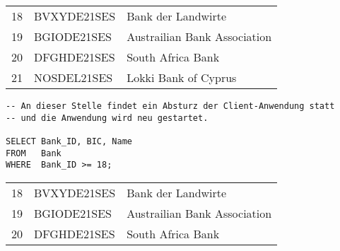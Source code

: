 \begin{center}
    \begin{small}
        \tablehead{}
        \begin{msoraclesql}
            \begin{supertabular}{rll}
                18 & BVXYDE21SES & Bank der Landwirte \\
                19 & BGIODE21SES & Austrailian Bank Association \\
                20 & DFGHDE21SES & South Africa Bank \\
                21 & NOSDEL21SES & Lokki Bank of Cyprus  \\
            \end{supertabular}
        \end{msoraclesql}
    \end{small}
\end{center}
\begin{lstlisting}[language=oracle_sql,label=sql07_25]
-- An dieser Stelle findet ein Absturz der Client-Anwendung statt
-- und die Anwendung wird neu gestartet.

SELECT Bank_ID, BIC, Name
FROM   Bank
WHERE  Bank_ID >= 18;
          \end{lstlisting}
\begin{center}
    \begin{small}
        \tablehead{}
        \begin{msoraclesql}
            \begin{supertabular}{rll}
                18 & BVXYDE21SES & Bank der Landwirte \\
                19 & BGIODE21SES & Austrailian Bank Association \\
                20 & DFGHDE21SES & South Africa Bank \\
            \end{supertabular}
        \end{msoraclesql}
    \end{small}
\end{center}

